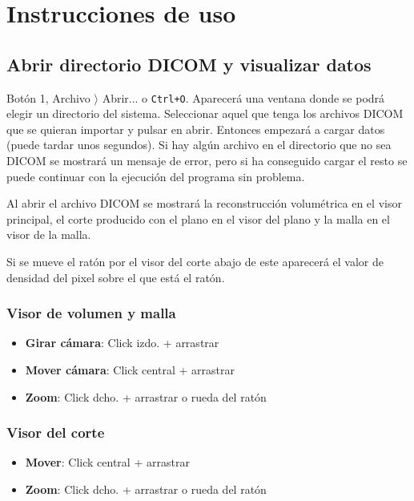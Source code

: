 \section{Instrucciones de uso}

\subsection{Abrir directorio DICOM y visualizar datos}

Botón 1, Archivo $ \rangle $ Abrir... o \texttt{Ctrl+O}. Aparecerá una ventana donde se podrá elegir un directorio del sistema. Seleccionar aquel que tenga los archivos DICOM que se quieran importar y pulsar en abrir. Entonces empezará a cargar datos (puede tardar unos segundos). Si hay algún archivo en el directorio que no sea DICOM se mostrará un mensaje de error, pero si ha conseguido cargar el resto se puede continuar con la ejecución del programa sin problema.

Al abrir el archivo DICOM se mostrará la reconstrucción volumétrica en el visor principal, el corte producido con el plano en el visor del plano y la malla en el visor de la malla.

Si se mueve el ratón por el visor del corte abajo de este aparecerá el valor de densidad del pixel sobre el que está el ratón.

\subsubsection{Visor de volumen y malla}

\begin{itemize}
	\item \textbf{Girar cámara}: Click izdo. + arrastrar
	\item \textbf{Mover cámara}: Click central + arrastrar
	\item \textbf{Zoom}: Click dcho. + arrastrar o rueda del ratón
\end{itemize}

\subsubsection{Visor del corte}

\begin{itemize}
	\item \textbf{Mover}: Click central + arrastrar
	\item \textbf{Zoom}: Click dcho. + arrastrar o rueda del ratón
\end{itemize}

